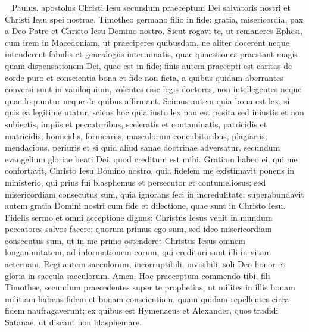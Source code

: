 
\begin{biblechapter}  
\verse Paulus, apostolus Christi Iesu secundum praeceptum Dei salvatoris nostri et Christi Iesu spei nostrae, 
\verse Timotheo germano filio in fide: gratia, misericordia, pax a Deo Patre et Christo Iesu Domino nostro. 
\verse Sicut rogavi te, ut remaneres Ephesi, cum irem in Macedoniam, ut praeciperes quibusdam, ne aliter docerent 
\verse neque intenderent fabulis et genealogiis interminatis, quae quaestiones praestant magis quam dispensationem Dei, quae est in fide; 
\verse finis autem praecepti est caritas de corde puro et conscientia bona et fide non ficta, 
\verse a quibus quidam aberrantes conversi sunt in vaniloquium, 
\verse volentes esse legis doctores, non intellegentes neque quae loquuntur neque de quibus affirmant. 
\verse Scimus autem quia bona est lex, si quis ea legitime utatur, 
\verse sciens hoc quia iusto lex non est posita sed iniustis et non subiectis, impiis et peccatoribus, sceleratis et contaminatis, patricidis et matricidis, homicidis, 
\verse fornicariis, masculorum concubitoribus, plagiariis, mendacibus, periuris et si quid aliud sanae doctrinae adversatur, 
\verse secundum evangelium gloriae beati Dei, quod creditum est mihi. 
\verse Gratiam habeo ei, qui me confortavit, Christo Iesu Domino nostro, quia fidelem me existimavit ponens in ministerio, 
\verse qui prius fui blasphemus et persecutor et contumeliosus; sed misericordiam consecutus sum, quia ignorans feci in incredulitate; 
\verse superabundavit autem gratia Domini nostri cum fide et dilectione, quae sunt in Christo Iesu. 
\verse Fidelis sermo et omni acceptione dignus: Christus Iesus venit in mundum peccatores salvos facere; quorum primus ego sum, 
\verse sed ideo misericordiam consecutus sum, ut in me primo ostenderet Christus Iesus omnem longanimitatem, ad informationem eorum, qui credituri sunt illi in vitam aeternam. 
\verse Regi autem saeculorum, incorruptibili, invisibili, soli Deo honor et gloria in saecula saeculorum. Amen. 
\verse Hoc praeceptum commendo tibi, fili Timothee, secundum praecedentes super te prophetias, ut milites in illis bonam militiam 
\verse habens fidem et bonam conscientiam, quam quidam repellentes circa fidem naufragaverunt; 
\verse ex quibus est Hymenaeus et Alexander, quos tradidi Satanae, ut discant non blasphemare. 
\end{biblechapter}

